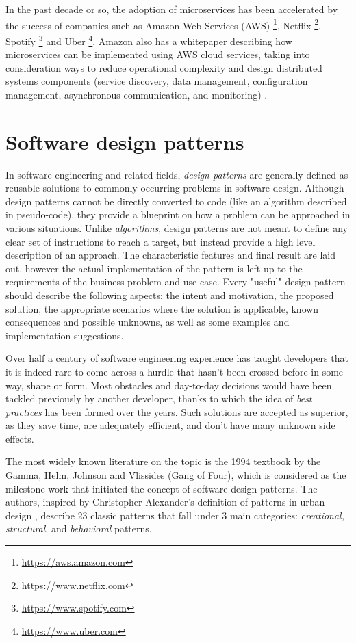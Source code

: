 In the past decade or so, the adoption of microservices has been accelerated by the success of companies such as Amazon Web Services (AWS) \footnote{\url{https://aws.amazon.com}}, Netflix \footnote{\url{https://www.netflix.com}}, Spotify \footnote{\url{https://www.spotify.com}} and Uber \footnote{\url{https://www.uber.com}}. Amazon also has a whitepaper describing how microservices can be implemented using AWS cloud services, taking into consideration ways to reduce operational complexity and design distributed systems components (service discovery, data management, configuration management, asynchronous communication, and monitoring) \cite{aws-microservices}.

\section{Software design patterns}

In software engineering and related fields, \textit{design patterns} are generally defined as reusable solutions to commonly occurring problems in software design. Although design patterns cannot be directly converted to code (like an algorithm described in pseudo-code), they provide a blueprint on how a problem can be approached in various situations. Unlike \textit{algorithms}, design patterns are not meant to define any clear set of instructions to reach a target, but instead provide a high level description of an approach. The characteristic features and final result are laid out, however the actual implementation of the pattern is left up to the requirements of the business problem and use case. Every "useful" design pattern should describe the following aspects: the intent and motivation, the proposed solution, the appropriate scenarios where the solution is applicable, known consequences and possible unknowns, as well as some examples and implementation suggestions.

Over half a century of software engineering experience has taught developers that it is indeed rare to come across a hurdle that hasn't been crossed before in some way, shape or form. Most obstacles and day-to-day decisions would have been tackled previously by another developer, thanks to which the idea of \textit{best practices} has been formed over the years. Such solutions are accepted as superior, as they save time, are adequately efficient, and don't have many unknown side effects.

The most widely known literature on the topic is the 1994 textbook \cite{gof94} by the Gamma, Helm, Johnson and Vlissides (Gang of Four), which is considered as the milestone work that initiated the concept of software design patterns. The authors, inspired by Christopher Alexander's definition of patterns in urban design \cite{alexander77}, describe 23 classic patterns that fall under 3 main categories: \textit{creational, structural}, and \textit{behavioral} patterns.

